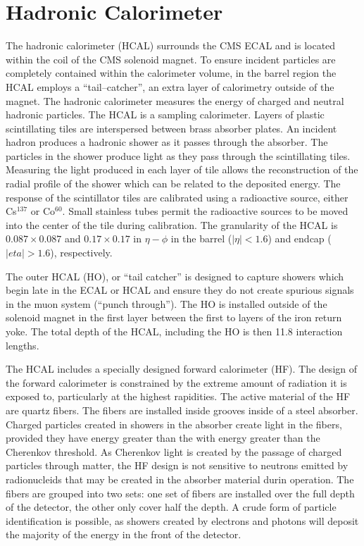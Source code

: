 \section{Hadronic Calorimeter}
\label{sec:HCAL} The hadronic calorimeter (HCAL) surrounds the CMS ECAL and is
located within the coil of the CMS solenoid magnet.  To ensure incident
particles are completely contained within the calorimeter volume, in the barrel
region the HCAL employs a ``tail--catcher'', an extra layer of calorimetry
outside of the magnet. The hadronic calorimeter measures the energy of charged
and neutral hadronic particles.  The HCAL is a sampling calorimeter.
Layers of plastic scintillating tiles are interspersed between brass absorber
plates.  An incident hadron produces a hadronic shower as it passes through the
absorber.  The particles in the shower produce light as they pass through the
scintillating tiles.  Measuring the light produced in each layer of tile allows
the reconstruction of the radial profile of the shower which can be related to
the deposited energy.  The response of the scintillator tiles are calibrated
using a radioactive source, either Cs$^{137}$ or Co$^{60}$.  Small stainless
tubes permit the radioactive sources to be moved into the center of the tile
during calibration.  The granularity of the HCAL is $0.087 \times 0.087$ and
$0.17 \times 0.17$ in $\eta-\phi$ in the barrel ($|\eta| < 1.6$) and endcap
($|eta| > 1.6$), respectively.

The outer HCAL (HO), or ``tail catcher'' is designed to capture showers which
begin late in the ECAL or HCAL and ensure they do not create spurious signals in
the muon system (``punch through'').  The HO is installed outside of the solenoid
magnet in the first layer between the first to layers of the iron return yoke.
The total depth of the HCAL, including the HO is then 11.8 interaction lengths.

The HCAL includes a specially designed forward calorimeter (HF).  The design of
the forward calorimeter is constrained by the extreme amount of radiation it is
exposed to, particularly at the highest rapidities.  The active material of the
HF are quartz fibers.  The fibers are installed inside grooves inside of a steel
absorber.  Charged particles created in showers in the absorber create light in
the fibers, provided they have energy greater than the with energy greater than
the Cherenkov threshold.  As Cherenkov light is created by the passage of
charged particles through matter, the HF design is not sensitive to neutrons
emitted by radionucleids that may be created in the absorber material durin
operation.  The fibers are grouped into two sets: one set of fibers are
installed over the full depth of the detector, the other only cover half the
depth.  A crude form of particle identification is possible, as showers created
by electrons and photons will deposit the majority of the energy in the front of
the detector.

